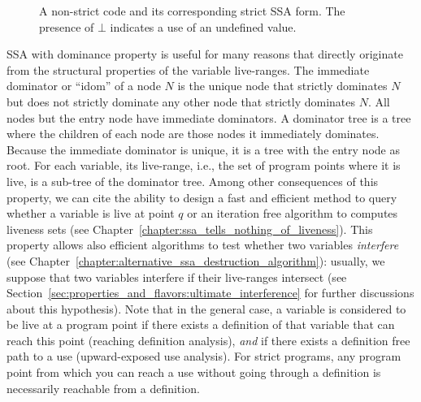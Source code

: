 \begin{figure}
\caption{A non-strict code and its corresponding strict SSA form. The presence of $\bot$ indicates a use of an undefined value.}
\end{figure}


SSA with dominance property is useful for many reasons that directly originate from the structural properties of the variable live-ranges. 
The immediate dominator or ``idom'' of a node $N$ is the unique node that strictly dominates $N$ but does not strictly dominate any other node that strictly dominates $N$. All nodes but the entry node have immediate dominators. A dominator tree is a tree where the children of each node are those nodes it immediately dominates. Because the immediate dominator is unique, it is a tree with the entry node as root. 
For each variable, its live-range, i.e., the set of program points where it is live, is a sub-tree of the dominator tree.
Among other consequences of this property, we can cite the ability to design a fast and efficient method to query whether a variable is live at point $q$ or an iteration free algorithm to computes liveness sets (see Chapter~\ref{chapter:ssa_tells_nothing_of_liveness}).
This property allows also efficient algorithms to test whether two variables \emph{interfere} (see Chapter~\ref{chapter:alternative_ssa_destruction_algorithm}):
usually, we suppose that two variables interfere if their live-ranges intersect (see Section~\ref{sec:properties_and_flavors:ultimate_interference} for further discussions about this hypothesis).
Note that in the general case, a variable is considered to be live at a program point if there exists a definition of that variable that can reach this point (reaching definition analysis), \emph{and} if there exists a definition free path to a use (upward-exposed use analysis). For strict programs, any program point from which you can reach a use without going through a definition is necessarily reachable from a definition. 

